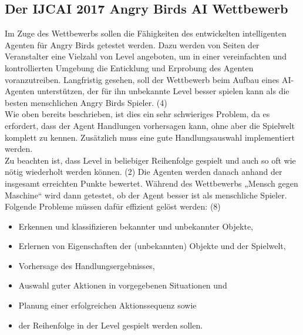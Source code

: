 \subsection{Der IJCAI 2017 Angry Birds AI Wettbewerb}
Im Zuge des Wettbewerbs sollen die Fähigkeiten des entwickelten intelligenten Agenten für Angry Birds getestet werden. Dazu werden von Seiten der Veranstalter eine Vielzahl von Level angeboten, um in einer vereinfachten und kontrollierten Umgebung die Enticklung und Erprobung des Agenten voranzutreiben. Langfristig gesehen, soll der Wettbewerb beim Aufbau eines AI-Agenten unterstützen, der für ihn unbekannte Level besser spielen kann als die besten menschlichen Angry Birds Spieler. (4)\\
Wie oben bereits beschrieben, ist dies ein sehr schwieriges Problem, da es erfordert, dass der Agent Handlungen vorhersagen kann, ohne aber die Spielwelt komplett zu kennen. Zusätzlich muss eine gute Handlungsauswahl implementiert werden.\\
Zu beachten ist, dass Level in beliebiger Reihenfolge gespielt und auch so oft wie nötig wiederholt werden können. (2) Die Agenten werden danach anhand der insgesamt erreichten Punkte bewertet. Während des Wettbewerbs „Mensch gegen Maschine“ wird dann getestet, ob der Agent besser ist als menschliche Spieler. Folgende Probleme müssen dafür effizient gelöst werden: (8)

\begin{itemize}
\item Erkennen und klassifizieren bekannter und unbekannter Objekte,
\item Erlernen von Eigenschaften der (unbekannten) Objekte und der Spielwelt,
\item Vorhersage des Handlungsergebnisses,
\item Auswahl guter Aktionen in vorgegebenen Situationen und
\item Planung einer erfolgreichen Aktionssequenz sowie
\item  der Reihenfolge in der Level gespielt werden sollen.
\end{itemize}

